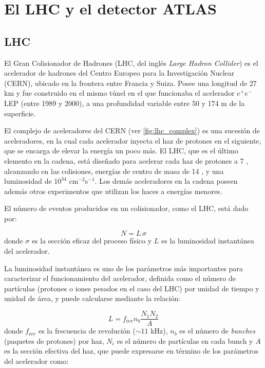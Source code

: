\chapter{El LHC y el detector ATLAS}
\label{cap:detector}


\section{LHC}

El Gran Colisionador de Hadrones (LHC, del inglés \emph{Large Hadron Collider})
\cite{Evans:1129806} es el acelerador de hadrones del Centro Europeo para la
Investigación Nuclear (CERN), ubicado en la frontera entre Francia y Suiza.
Posee una longitud de 27 km y fue construido en el mismo túnel en el que
funcionaba el acelerador $e^{+}e^{-}$ LEP \cite{LEP} (entre 1989 y 2000), a una
profundidad variable entre 50 y 174 m de la superficie.

El complejo de aceleradores del CERN (ver \cref{fig:lhc_complex}) es una
sucesión de aceleradores, en la cual cada acelerador inyecta el haz de protones
en el siguiente, que se encarga de elevar la energía un poco más. El LHC, que es
el último elemento en la cadena, está diseñado para acelerar cada haz de
protones a 7 \tev, alcanzando en las colisiones, energías de centro de masa de
14 \tev, y una luminosidad de $10^{34}$ cm$^{-2}$s$^{-1}$. Los demás
aceleradores en la cadena poseen además otros experimentos que utilizan los
haces a energías menores.

El número de eventos producidos en un colisionador, como el LHC, está dado
por:

\begin{equation}
  N = L \, \sigma
\end{equation}
%
donde $\sigma$ es la sección eficaz del proceso físico y $L$ es la luminosidad instantánea del
acelerador.


La luminosidad instantánea es uno de los parámetros más importantes para
caracterizar el funcionamiento del acelerador, definida como el número de
partículas (protones o iones pesados en el caso del LHC) por unidad de tiempo y unidad de
área, y puede calcularse mediante la relación:

\begin{equation}
  L = f_\text{rev} n_b \frac{N_1 N_2}{A}
\end{equation}
%
donde $f_\text{rev}$ es la frecuencia de revolución ($\sim 11$ kHz), $n_b$ es el número de
\emph{bunches} (paquetes de protones) por haz, $N_i$ es el número de partículas
en cada bunch y $A$ es la sección efectiva del haz, que puede expresarse en
término de los parámetros del acelerador como:

